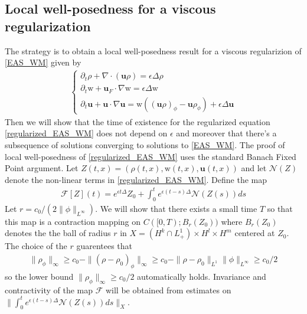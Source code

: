 \documentclass[11pt,letterpaper]{amsart}
\theoremstyle{plain}
\theoremstyle{definition}
\theoremstyle{remark}
\renewcommand{\geq}{\geqslant}
\def\u{\textbf{u}}
\def \wt {\mathrm{w}}
\begin{document}
\subsection{Local well-posedness for a viscous regularization}
The strategy is to obtain a local well-posedness result for a viscous regularizion of \eqref{EAS_WM} given by 
\begin{align*}
    \label{regularized_EAS_WM}
    \tag{WM'}
    \begin{cases}
        \partial_t \rho + \nabla \cdot (\u\rho) = \epsilon \Delta \rho \\
        \partial_t \wt + \u_F \cdot \nabla \wt = \epsilon \Delta \wt \\
        \partial_t \u + \u \cdot \nabla \u = \wt ((\u \rho)_{\phi} - \u \rho_{\phi}) + \epsilon \Delta \u
    \end{cases}
\end{align*}
Then we will show that the time of existence for the regularized equation \eqref{regularized_EAS_WM} does not depend on $\epsilon$ and moreover that there's a subsequence of solutions converging to solutions to \eqref{EAS_WM}. 
The proof of local well-posedness of \eqref{regularized_EAS_WM} uses the standard Banach Fixed Point argument. 
Let $Z(t,x) = (\rho(t,x), \wt(t,x), \u(t,x))$ and let $\mathcal{N}(Z)$ denote the non-linear terms in \eqref{regularized_EAS_WM}. 
Define the map 
\begin{align}
    \label{duhamel_formula}
    \mathcal{F}[Z](t) = 
        e^{\epsilon t \Delta} Z_0 + \int_0^t e^{\epsilon (t-s) \Delta} \mathcal{N}(Z(s)) ds 
\end{align}
Let $r = c_0 / (2 \|\phi\|_{L^{\infty}})$.
We will show that there exists a small time $T$ so that this map is a contraction mapping 
on $C([0,T); B_{r}(Z_0))$ where $B_{r}(Z_0)$ denotes the the ball of radius $r$ in 
$X = (H^k \cap L^1_+) \times H^l \times H^m$ centered at $Z_0$.
The choice of the $r$ guarentees that 
\begin{align*}
    \|\rho_{\phi}\|_{\infty} \geq c_0 - \|(\rho - \rho_0)_{\phi}\|_{\infty}
        \geq c_0 - \|\rho - \rho_0\|_{L^1} \|{\phi}\|_{L^{\infty}} \geq c_0/2 
\end{align*}
so the lower bound $\|\rho_{\phi}\|_{\infty} \geq c_0/2$ automatically holds.
Invariance and contractivity of the map $\mathcal{F}$ will be obtained 
from estimates on $\|\int_0^t e^{\epsilon(t-s)\Delta} \mathcal{N}(Z(s)) ds\|_X$.
\end{document}
